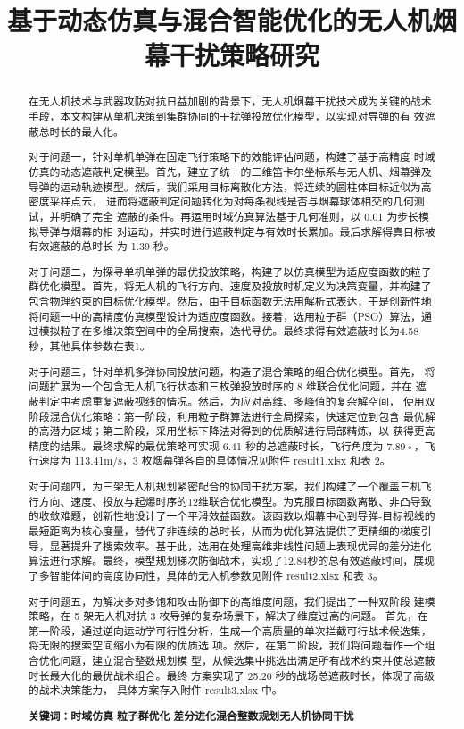 \documentclass[5pt, withoutpreface,bwprint]{cumcmthesis} %
\title{基于动态仿真与混合智能优化的无人机烟幕干扰策略研究}
\begin{document}
\maketitle
\begin{abstract}
在无人机技术与武器攻防对抗日益加剧的背景下，无人机烟幕干扰技术成为关键的战术手段，本文构建从单机决策到集群协同的干扰弹投放优化模型，以实现对导弹的有
效遮蔽总时长的最大化。

对于问题一，针对单机单弹在固定飞行策略下的效能评估问题，构建了基于高精度
时域仿真的动态遮蔽判定模型。首先，建立了统一的三维笛卡尔坐标系与无人机、烟幕弹及导弹的运动轨迹模型。然后，我们采用目标离散化方法，将连续的圆柱体目标近似为高密度采样点云，
进而将遮蔽判定问题转化为对每条视线是否与烟幕球体相交的几何测试，并明确了完全
遮蔽的条件。再运用时域仿真算法基于几何准则，以 0.01 为步长模拟导弹与烟幕的相
对运动，并实时进行遮蔽判定与有效时长累加。最后求解得真目标被有效遮蔽的总时长
为 1.39 秒。

对于问题二，为探寻单机单弹的最优投放策略，构建了以仿真模型为适应度函数的粒子群优化模型。首先，将无人机的飞行方向、速度及投放时机定义为决策变量，并构建了包含物理约束的目标优化模型。然后，由于目标函数无法用解析式表达，于是创新性地将问题一中的高精度仿真模型设计为适应度函数。接着，选用粒子群（PSO）算法，通过模拟粒子在多维决策空间中的全局搜索，迭代寻优。最终求得有效遮蔽时长为4.58秒，其他具体参数在表1。

对于问题三，针对单机多弹协同投放问题，构造了混合策略的组合优化模型。首先，
将问题扩展为一个包含无人机飞行状态和三枚弹投放时序的 8 维联合优化问题，并在
遮蔽判定中考虑重复遮蔽视线的情况。然后，为应对高维、多峰值的复杂解空间，
使用双阶段混合优化策略：第一阶段，利用粒子群算法进行全局探索，快速定位到包含
最优解的高潜力区域；第二阶段，采用坐标下降法对得到的优质解进行局部精炼，以
获得更高精度的结果。最终求解的最优策略可实现 6.41 秒的总遮蔽时长，飞行角度为
7.89◦，飞行速度为 113.41m/s，3 枚烟幕弹各自的具体情况见附件 result1.xlsx 和表 2。

对于问题四，为三架无人机规划紧密配合的协同干扰方案，我们构建了一个覆盖三机飞行方向、速度、投放与起爆时序的12维联合优化模型。为克服目标函数离散、非凸导致的收敛难题，创新性地设计了一个平滑效益函数。该函数以烟幕中心到导弹-目标视线的最短距离为核心度量，替代了非连续的总时长，从而为优化算法提供了更精细的梯度引导，显著提升了搜索效率。基于此，选用在处理高维非线性问题上表现优异的差分进化算法进行求解。最终，模型规划梯次防御战术，实现了12.84秒的总有效遮蔽时间，展现了多智能体间的高度协同性，具体的无人机参数见附件 result2.xlsx 和表 3。



对于问题五，为解决多对多饱和攻击防御下的高维度问题，我们提出了一种双阶段
建模策略，在 5 架无人机对抗 3 枚导弹的复杂场景下，解决了维度过高的问题。
首先，在第一阶段，通过逆向运动学可行性分析，生成一个高质量的单次拦截可行战术候选集，将无限的搜索空间缩小为有限的优质选
项。然后，在第二阶段，我们将问题看作一个组合优化问题，建立混合整数规划模
型，从候选集中挑选出满足所有战术约束并使总遮蔽时长最大化的最优战术组合。最终
方案实现了 25.20 秒的战场总遮蔽时长，体现了高级的战术决策能力，
具体方案存入附件 result3.xlsx 中。


\textbf{关键词：}\textbf{时域仿真} \quad \textbf{粒子群优化} \quad \textbf{差分进化}\quad \textbf{混合整数规划}\quad \textbf{无人机协同干扰}
\end{abstract}
\end{document}
